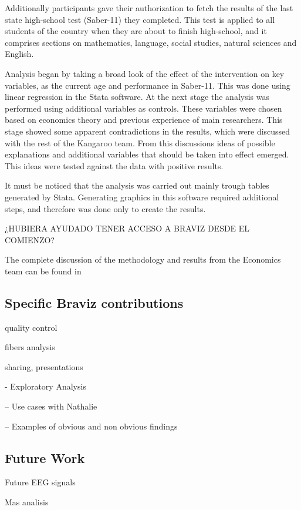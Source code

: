 Additionally participants gave their authorization to fetch the results of the last state high-school test (Saber-11) they completed. This test is applied to all students of the country when they are about to finish high-school, and it comprises sections on mathematics, language, social studies, natural sciences and English.

Analysis began by taking a broad look of the effect of the intervention on key variables, as the current age and performance in Saber-11. This was done using linear regression in the Stata software. At the next stage the analysis was performed using additional variables as controls. These variables were chosen based on economics theory and previous experience of main researchers. This stage showed some apparent contradictions in the results, which were discussed with the rest of the Kangaroo team. From this discussions ideas of possible explanations and additional variables that should be taken into effect emerged. This ideas were tested against the data with positive results. 

It must be noticed that the analysis was carried out mainly trough tables generated by Stata. Generating graphics in this software required additional steps, and therefore was done only to create the results.

¿HUBIERA AYUDADO TENER ACCESO A BRAVIZ DESDE EL COMIENZO?


The complete discussion of the methodology and results from the Economics team can be found in \autocite{?}



\subsection{Specific Braviz contributions}

quality control

fibers analysis

sharing, presentations

 - Exploratory Analysis

 -- Use cases with Nathalie

 -- Examples of obvious and non obvious findings

\subsection{Future Work}

Future
EEG signals

Mas analisis

